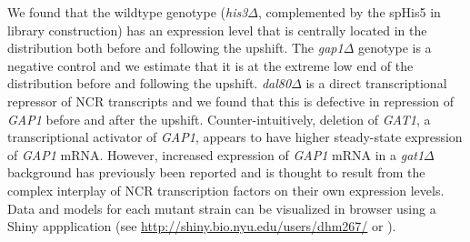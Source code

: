 We found that the wildtype
genotype (\textit{his3}$\Delta$, complemented by the spHis5 in
library construction) has an expression level that is centrally
located in the distribution both before and following the upshift. The
\textit{gap1}$\Delta$ genotype is a negative control and 
we estimate that it is at the extreme
low end of the distribution before and following the upshift. 
\textit{dal80}$\Delta$ is a direct transcriptional repressor
of NCR transcripts %
and we found that this is defective in
repression of \textit{GAP1} before and after the upshift. 
Counter-intuitively, deletion of \textit{GAT1}, a transcriptional activator
of \textit{GAP1}, appears to have higher steady-state expression of
\textit{GAP1} mRNA.
However, increased expression of \textit{GAP1} mRNA in a
\textit{gat1}$\Delta$ background has
previously been reported \parencite{scherens2006identification} and is thought to
result from the complex interplay of NCR transcription factors on
their own expression levels. 
Data and models for each mutant strain can be visualized in browser
using a Shiny appplication (see
\url{http://shiny.bio.nyu.edu/users/dhm267/} or ). 


